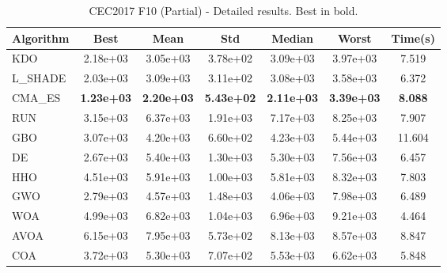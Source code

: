 \begin{table}[H]
\centering\small
\caption{CEC2017 F10 (Partial) - Detailed results. Best in bold.}
\label{tab:cec2017_F10}
\begin{tabular}{lcccccc}
\toprule
\textbf{Algorithm} & \textbf{Best} & \textbf{Mean} & \textbf{Std} & \textbf{Median} & \textbf{Worst} & \textbf{Time(s)} \\
\midrule
KDO & 2.18e+03 & 3.05e+03 & 3.78e+02 & 3.09e+03 & 3.97e+03 & 7.519 \\
L_SHADE & 2.03e+03 & 3.09e+03 & 3.11e+02 & 3.08e+03 & 3.58e+03 & 6.372 \\
CMA_ES & \textbf{1.23e+03} & \textbf{2.20e+03} & \textbf{5.43e+02} & \textbf{2.11e+03} & \textbf{3.39e+03} & \textbf{8.088} \\
RUN & 3.15e+03 & 6.37e+03 & 1.91e+03 & 7.17e+03 & 8.25e+03 & 7.907 \\
GBO & 3.07e+03 & 4.20e+03 & 6.60e+02 & 4.23e+03 & 5.44e+03 & 11.604 \\
DE & 2.67e+03 & 5.40e+03 & 1.30e+03 & 5.30e+03 & 7.56e+03 & 6.457 \\
HHO & 4.51e+03 & 5.91e+03 & 1.00e+03 & 5.81e+03 & 8.32e+03 & 7.803 \\
GWO & 2.79e+03 & 4.57e+03 & 1.48e+03 & 4.06e+03 & 7.98e+03 & 6.489 \\
WOA & 4.99e+03 & 6.82e+03 & 1.04e+03 & 6.96e+03 & 9.21e+03 & 4.464 \\
AVOA & 6.15e+03 & 7.95e+03 & 5.73e+02 & 8.13e+03 & 8.57e+03 & 8.847 \\
COA & 3.72e+03 & 5.30e+03 & 7.07e+02 & 5.53e+03 & 6.62e+03 & 5.848 \\
\bottomrule
\end{tabular}
\end{table}
